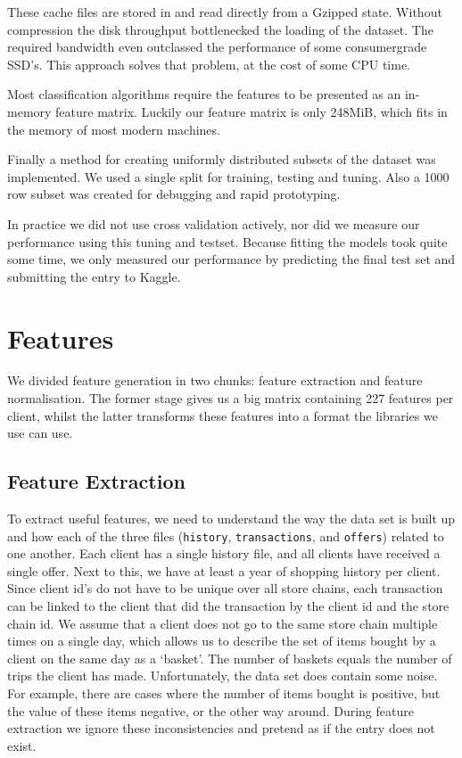 \documentclass[a4paper]{article}
\begin{document}
These cache files are stored in and read directly from a Gzipped state. Without
compression the disk throughput bottlenecked the loading of the dataset. The
required bandwidth even outclassed the performance of some consumergrade SSD's.
This approach solves that problem, at the cost of some CPU time.

Most classification algorithms require the features to be presented as an
in-memory feature matrix. Luckily our feature matrix is only 248MiB, which fits
in the memory of most modern machines.

Finally a method for creating uniformly distributed subsets of the dataset was
implemented. We used a single split for training, testing and tuning. Also a
1000 row subset was created for debugging and rapid prototyping.

In practice we did not use cross validation actively, nor did we measure our
performance using this tuning and testset. Because fitting the models took quite
some time, we only measured our performance by predicting the final test set and
submitting the entry to Kaggle.

\section{Features}
We divided feature generation in two chunks: feature extraction and feature normalisation. The former stage gives us a big matrix containing 227 features per client, whilst the latter transforms these features into a format the libraries we use can use.

\subsection{Feature Extraction}
To extract useful features, we need to understand the way the data set is built up and how each of the three files (\texttt{history}, \texttt{transactions}, and \texttt{offers}) related to one another. Each client has a single history file, and all clients have received a single offer. Next to this, we have at least a year of shopping history per client. Since client id's do not have to be unique over all store chains, each transaction can be linked to the client that did the transaction by the client id and the store chain id. We assume that a client does not go to the same store chain multiple times on a single day, which allows us to describe the set of items bought by a client on the same day as a `basket'. The number of baskets equals the number of trips the client has made. Unfortunately, the data set does contain some noise. For example, there are cases where the number of items bought is positive, but the value of these items negative, or the other way around. During feature extraction we ignore these inconsistencies and pretend as if the entry does not exist.
\end{document}
